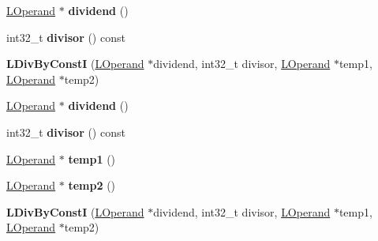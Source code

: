 \begin{DoxyCompactItemize}
\item 
\hyperlink{classv8_1_1internal_1_1_l_operand}{L\+Operand} $\ast$ {\bfseries dividend} ()\hypertarget{classv8_1_1internal_1_1_l_div_by_const_i_aa810bcd07c3b1e6e6fefc71b0125b9fb}{}\label{classv8_1_1internal_1_1_l_div_by_const_i_aa810bcd07c3b1e6e6fefc71b0125b9fb}

\item 
int32\+\_\+t {\bfseries divisor} () const \hypertarget{classv8_1_1internal_1_1_l_div_by_const_i_a54e98ed246800cdb3d19b87abf836d6a}{}\label{classv8_1_1internal_1_1_l_div_by_const_i_a54e98ed246800cdb3d19b87abf836d6a}

\item 
{\bfseries L\+Div\+By\+ConstI} (\hyperlink{classv8_1_1internal_1_1_l_operand}{L\+Operand} $\ast$dividend, int32\+\_\+t divisor, \hyperlink{classv8_1_1internal_1_1_l_operand}{L\+Operand} $\ast$temp1, \hyperlink{classv8_1_1internal_1_1_l_operand}{L\+Operand} $\ast$temp2)\hypertarget{classv8_1_1internal_1_1_l_div_by_const_i_a2e3dda604aa41033468bfe062f3ff613}{}\label{classv8_1_1internal_1_1_l_div_by_const_i_a2e3dda604aa41033468bfe062f3ff613}

\item 
\hyperlink{classv8_1_1internal_1_1_l_operand}{L\+Operand} $\ast$ {\bfseries dividend} ()\hypertarget{classv8_1_1internal_1_1_l_div_by_const_i_aa810bcd07c3b1e6e6fefc71b0125b9fb}{}\label{classv8_1_1internal_1_1_l_div_by_const_i_aa810bcd07c3b1e6e6fefc71b0125b9fb}

\item 
int32\+\_\+t {\bfseries divisor} () const \hypertarget{classv8_1_1internal_1_1_l_div_by_const_i_a54e98ed246800cdb3d19b87abf836d6a}{}\label{classv8_1_1internal_1_1_l_div_by_const_i_a54e98ed246800cdb3d19b87abf836d6a}

\item 
\hyperlink{classv8_1_1internal_1_1_l_operand}{L\+Operand} $\ast$ {\bfseries temp1} ()\hypertarget{classv8_1_1internal_1_1_l_div_by_const_i_af66612b9ebb597ea81860967afc4040c}{}\label{classv8_1_1internal_1_1_l_div_by_const_i_af66612b9ebb597ea81860967afc4040c}

\item 
\hyperlink{classv8_1_1internal_1_1_l_operand}{L\+Operand} $\ast$ {\bfseries temp2} ()\hypertarget{classv8_1_1internal_1_1_l_div_by_const_i_a46fb7a65df1ba0c245d91d753df2e66c}{}\label{classv8_1_1internal_1_1_l_div_by_const_i_a46fb7a65df1ba0c245d91d753df2e66c}

\item 
{\bfseries L\+Div\+By\+ConstI} (\hyperlink{classv8_1_1internal_1_1_l_operand}{L\+Operand} $\ast$dividend, int32\+\_\+t divisor, \hyperlink{classv8_1_1internal_1_1_l_operand}{L\+Operand} $\ast$temp1, \hyperlink{classv8_1_1internal_1_1_l_operand}{L\+Operand} $\ast$temp2)\hypertarget{classv8_1_1internal_1_1_l_div_by_const_i_a2e3dda604aa41033468bfe062f3ff613}{}\label{classv8_1_1internal_1_1_l_div_by_const_i_a2e3dda604aa41033468bfe062f3ff613}


\end{DoxyCompactItemize}
